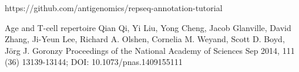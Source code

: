 \documentclass{article}
\begin{document}
\newpage
 	\begin{thebibliography}{9}
 		https://github.com/antigenomics/repseq-annotation-tutorial
 		
 		
 		Age and T-cell repertoire
 		Qian Qi, Yi Liu, Yong Cheng, Jacob Glanville, David Zhang, Ji-Yeun Lee, Richard A. Olshen, Cornelia M. Weyand, Scott D. Boyd, Jörg J. Goronzy
 		Proceedings of the National Academy of Sciences Sep 2014, 111 (36) 13139-13144; DOI: 10.1073/pnas.1409155111
 		
 		
 
 	\end{thebibliography}
 	
 	
 	
 	
 
\end{document}

